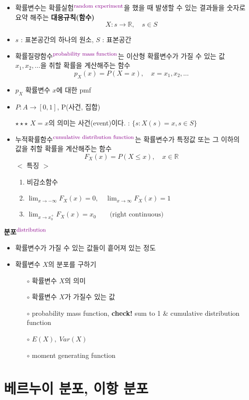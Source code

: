 \documentclass{oblivoir}
\newcommand{\DC}[1]{\textcolor{DarkMagenta}{#1}}%
\newcommand{\UP}[1]{$^{\mbox{\DC{\footnotesize #1}}}$}
\begin{document}
\begin{itemize}
\item 확률변수는 확률실험\UP{random experiment}을 했을 때 발생할 수 있는 결과들을 숫자로 요약 해주는 \textbf{대응규칙(함수)}
$$
X : s \rightarrow \mathbb{R}, \quad  s \in S
$$
\item $s$ : 표본공간의 하나의 원소, $S$ : 표본공간
\item 확률질량함수\UP{probability mass function}는 이산형 확률변수가 가질 수 있는 값 $x_1, x_2, \ldots$을 취할 확률을 계산해주는 함수
$$
p_X (x) = P(X=x), \quad x = x_1, x_2, \ldots
$$
\item $p_X$ 확률변수 $x$에 대한 pmf
\item $P : A \rightarrow [0, 1]$, P(사건, 집합)
\item[$\star\star\star$] $X = x$의 의미는 사건(event)이다. : $\{s : X(s) = x, s \in S\}$
\item 누적확률함수\UP{cumulative distribution function}는 확률변수가 특정값 또는 그 이하의 값을 취할 확률을 계산해주는 함수
$$
F_X(x) = P(X \leq x), \quad x \in \mathbb{R}
$$
$<$ 특징 $>$
\begin{enumerate}
\item 비감소함수
\item 
$
\displaystyle
\lim_{x \rightarrow -\infty} F_X(x) = 0 , \quad
\lim_{x \rightarrow \infty} F_X(x) = 1
$
\item
$
\displaystyle
\lim_{x \rightarrow  x_0^+} F_X(x) = x_0 \qquad \mbox{(right continuous)}
$
\end{enumerate}
\end{itemize}
\textbf{분포}\UP{distribution}
\begin{itemize}
\item 확률변수가 가질 수 있는 값들이 흩어져 있는 정도
\item 확률변수 $X$의 분포를 구하기
\begin{itemize}
\item[$\circ$] 확률변수 $X$의 의미
\item[$\circ$] 확률변수 $X$가 가질수 있는 값
\item[$\circ$] probability mass function, \textbf{check!} sum to 1 \& cumulative distribution function
\item[$\circ$] $E(X), \; Var(X)$
\item[$\circ$] moment generating function
\end{itemize}
\end{itemize}

\section{베르누이 분포, 이항 분포}
\end{document}
